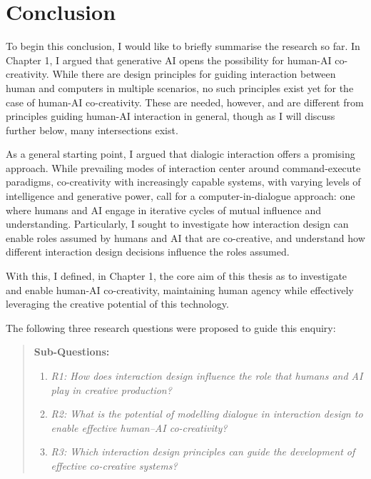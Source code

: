 
\chapter[Conclusion]{Conclusion}\label{c:conclusion}

To begin this conclusion, I would like to briefly summarise the research so far. In Chapter 1, I argued that generative AI opens the possibility for human-AI co-creativity. While there are design principles for guiding interaction between human and computers in multiple scenarios, no such principles exist yet for the case of human-AI co-creativity. These are needed, however, and are different from principles guiding human-AI interaction in general, though as I will discuss further below, many intersections exist.

As a general starting point, I argued that dialogic interaction offers a promising approach. While prevailing modes of interaction center around command-execute paradigms, co-creativity with increasingly capable systems, with varying levels of intelligence and generative power, call for a computer-in-dialogue approach: one where humans and AI engage in iterative cycles of mutual influence and understanding. Particularly, I sought to investigate how interaction design can enable roles assumed by humans and AI that are co-creative, and understand how different interaction design decisions influence the roles assumed.

With this, I defined, in Chapter 1, the core aim of this thesis as to investigate and enable human-AI co-creativity, maintaining human agency while effectively leveraging the creative potential of this technology.

The following three research questions were proposed to guide this enquiry:

\begin{quote}
\textbf{Sub-Questions:}
\begin{enumerate}
    \item \emph{R1: How does interaction design influence the role that humans and AI play in creative production?}
    \item \emph{R2: What is the potential of modelling dialogue in interaction design to enable effective human–AI co-creativity?}
    \item \emph{R3: Which interaction design principles can guide the development of effective co-creative systems?}
\end{enumerate}
\end{quote}

